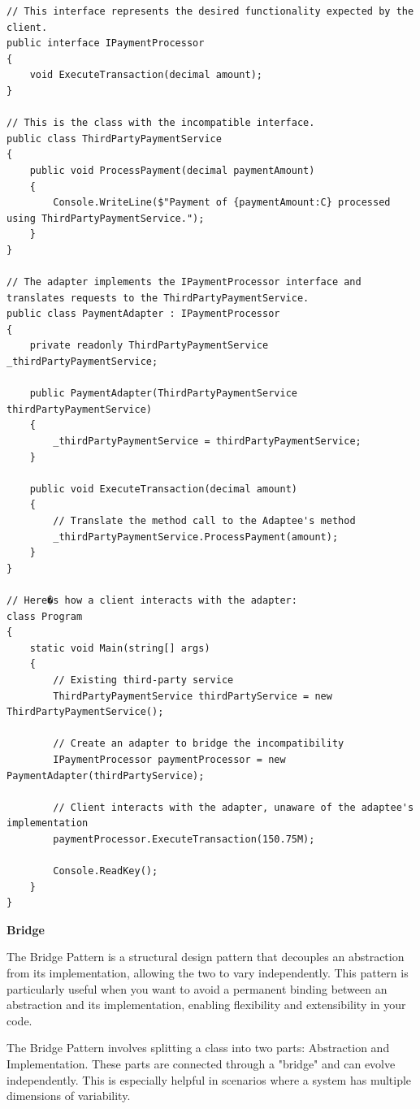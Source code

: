 \begin{lstlisting}
// This interface represents the desired functionality expected by the client.
public interface IPaymentProcessor
{
    void ExecuteTransaction(decimal amount);
}

// This is the class with the incompatible interface.
public class ThirdPartyPaymentService
{
    public void ProcessPayment(decimal paymentAmount)
    {
        Console.WriteLine($"Payment of {paymentAmount:C} processed using ThirdPartyPaymentService.");
    }
}

// The adapter implements the IPaymentProcessor interface and translates requests to the ThirdPartyPaymentService.
public class PaymentAdapter : IPaymentProcessor
{
    private readonly ThirdPartyPaymentService _thirdPartyPaymentService;

    public PaymentAdapter(ThirdPartyPaymentService thirdPartyPaymentService)
    {
        _thirdPartyPaymentService = thirdPartyPaymentService;
    }

    public void ExecuteTransaction(decimal amount)
    {
        // Translate the method call to the Adaptee's method
        _thirdPartyPaymentService.ProcessPayment(amount);
    }
}

// Here�s how a client interacts with the adapter:
class Program
{
    static void Main(string[] args)
    {
        // Existing third-party service
        ThirdPartyPaymentService thirdPartyService = new ThirdPartyPaymentService();

        // Create an adapter to bridge the incompatibility
        IPaymentProcessor paymentProcessor = new PaymentAdapter(thirdPartyService);

        // Client interacts with the adapter, unaware of the adaptee's implementation
        paymentProcessor.ExecuteTransaction(150.75M);

        Console.ReadKey();
    }
}
\end{lstlisting}


\medskip
\begin{center}
\textbf{Bridge}
\end{center}

The Bridge Pattern is a structural design pattern that decouples an abstraction from its implementation, allowing the two to vary independently. This pattern is particularly useful when you want to avoid a permanent binding between an abstraction and its implementation, enabling flexibility and extensibility in your code.

The Bridge Pattern involves splitting a class into two parts: Abstraction and Implementation. These parts are connected through a "bridge" and can evolve independently. This is especially helpful in scenarios where a system has multiple dimensions of variability.


